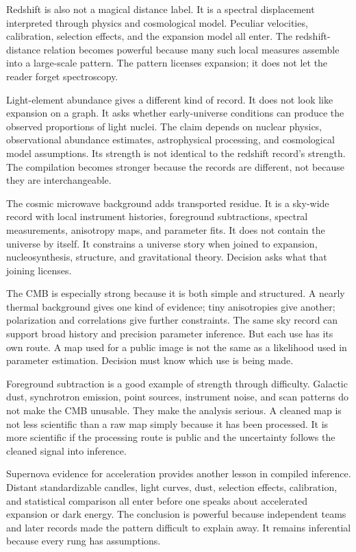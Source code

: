 Redshift is also not a magical distance label. It is a spectral displacement
interpreted through physics and cosmological model. Peculiar velocities,
calibration, selection effects, and the expansion model all enter. The
redshift-distance relation becomes powerful because many such local measures
assemble into a large-scale pattern. The pattern licenses expansion; it does
not let the reader forget spectroscopy.

Light-element abundance gives a different kind of record. It does not look
like expansion on a graph. It asks whether early-universe conditions can
produce the observed proportions of light nuclei. The claim depends on
nuclear physics, observational abundance estimates, astrophysical processing,
and cosmological model assumptions. Its strength is not identical to the
redshift record's strength. The compilation becomes stronger because the
records are different, not because they are interchangeable.

The cosmic microwave background adds transported residue. It is a sky-wide
record with local instrument histories, foreground
subtractions, spectral measurements, anisotropy maps, and parameter fits. It
does not contain the universe by itself. It constrains a universe story when
joined to expansion, nucleosynthesis, structure, and gravitational theory.
Decision asks what that joining licenses.

The CMB is especially strong because it is both simple and structured. A
nearly thermal background gives one kind of evidence; tiny anisotropies give
another; polarization and correlations give further constraints. The same sky
record can support broad history and precision parameter inference. But each
use has its own route. A map used for a public image is not the same as a
likelihood used in parameter estimation. Decision must know which use is
being made.

Foreground subtraction is a good example of strength through difficulty.
Galactic dust, synchrotron emission, point sources, instrument noise, and
scan patterns do not make the CMB unusable. They make the analysis serious.
A cleaned map is not less scientific than a raw map simply because it has
been processed. It is more scientific if the processing route is public and
the uncertainty follows the cleaned signal into inference.

Supernova evidence for acceleration provides another lesson in compiled
inference. Distant standardizable candles, light curves, dust, selection
effects, calibration, and statistical comparison all enter before one speaks
about accelerated expansion or dark energy. The conclusion is powerful
because independent teams and later records made the pattern difficult to
explain away. It remains inferential because every rung has assumptions.

